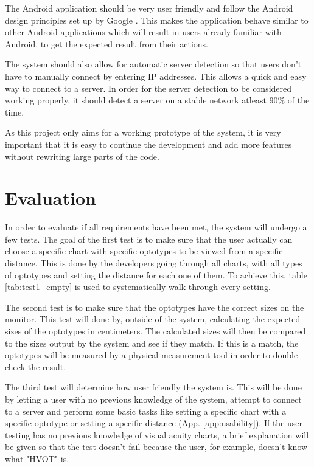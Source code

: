 \documentclass[12pt,a4paper,notitlepage]{report}
\begin{document}
The Android application should be very user friendly and follow the Android design principles set up by Google \cite{android_design}. This makes the application behave similar to other Android applications which will result in users already familiar with Android, to get the expected result from their actions. 

The system should also allow for automatic server detection so that users don't have to manually connect by entering IP addresses. This allows a quick and easy way to connect to a server. In order for the server detection to be considered working properly, it should detect a server on a stable network atleast 90\% of the time.

As this project only aims for a working prototype of the system, it is very important that it is easy to continue the development and add more features without rewriting large parts of the code.

\section{Evaluation \label{sec:evaluation}}
In order to evaluate if all requirements have been met, the system will undergo a few tests. The goal of the first test is to make sure that the user actually can choose a specific chart with specific optotypes to be viewed from a specific distance. This is done by the developers going through all charts, with all types of optotypes and setting the distance for each one of them. To achieve this, table \ref{tab:test1_empty} is used to systematically walk through every setting.

The second test is to make sure that the optotypes have the correct sizes on the monitor. This test will done by, outside of the system, calculating the expected sizes of the optotypes in centimeters. The calculated sizes will then be compared to the sizes output by the system and see if they match. If this is a match, the optotypes will be measured by a physical measurement tool in order to double check the result.

The third test will determine how user friendly the system is. This will be done by letting a user with no previous knowledge of the system, attempt to connect to a server and perform some basic tasks like setting a specific chart with a specific optotype or setting a specific distance (App. \ref{app:usability}). If the user testing has no previous knowledge of visual acuity charts, a brief explanation will be given so that the test doesn't fail because the user, for example, doesn't know what "HVOT" is.
\end{document}
